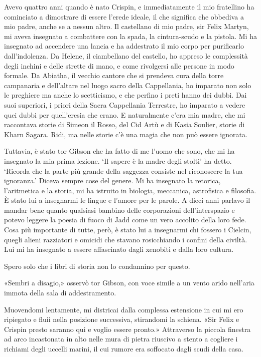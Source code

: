 Avevo quattro anni quando è nato Crispin, e immediatamente il mio
fratellino ha cominciato a dimostrare di essere l'erede ideale, il che
significa che obbediva a mio padre, anche se a nessun altro. Il
castellano di mio padre, sir Felix Martyn, mi aveva insegnato a
combattere con la spada, la cintura-scudo e la pistola. Mi ha insegnato
ad accendere una lancia e ha addestrato il mio corpo per purificarlo
dall'indolenza. Da Helene, il ciambellano del castello, ho appreso le
complessità degli inchini e delle strette di mano, e come rivolgersi
alle persone in modo formale. Da Abiatha, il vecchio cantore che si
prendeva cura della torre campanaria e dell'altare nel luogo sacro della
Cappellania, ho imparato non solo le preghiere ma anche lo scetticismo,
e che perfino i preti hanno dei dubbi. Dai suoi superiori, i priori
della Sacra Cappellania Terrestre, ho imparato a vedere quei dubbi per
quell'eresia che erano. E naturalmente c'era mia madre, che mi
raccontava storie di Simeon il Rosso, del Cid Artù e di Kasia Soulier,
storie di Kharn Sagara. Ridi, ma nelle storie c'è una magia che non può
essere ignorata.

Tuttavia, è stato tor Gibson che ha fatto di me l'uomo che sono, che mi
ha insegnato la mia prima lezione. `Il sapere è la madre degli stolti'
ha detto. `Ricorda che la parte più grande della saggezza consiste nel
riconoscere la tua ignoranza.' Diceva sempre cose del genere. Mi ha
insegnato la retorica, l'aritmetica e la storia, mi ha istruito in
biologia, meccanica, astrofisica e filosofia. È stato lui a insegnarmi
le lingue e l'amore per le parole. A dieci anni parlavo il mandar bene
quanto qualsiasi bambino delle corporazioni dell'interspazio e potevo
leggere la poesia di fuoco di Jadd come un vero accolito della loro
fede. Cosa più importante di tutte, però, è stato lui a insegnarmi chi
fossero i Cielcin, quegli alieni razziatori e omicidi che stavano
rosicchiando i confini della civiltà. Lui mi ha insegnato a essere
affascinato dagli xenobiti e dalla loro cultura.

Spero solo che i libri di storia non lo condannino per questo.

\begin{figure}
	\centering
	\def\svgwidth{\columnwidth}
	\scalebox{0.2}{}
\end{figure}

«Sembri a disagio,» osservò tor Gibson, con voce simile a un vento arido
nell'aria immota della sala di addestramento.

Muovendomi lentamente, mi districai dalla complessa estensione in cui mi
ero ripiegato e fluii nella posizione successiva, stirandomi la schiena.
«Sir Felix e Crispin presto saranno qui e voglio essere pronto.»
Attraverso la piccola finestra ad arco incastonata in alto nelle mura di
pietra riuscivo a stento a cogliere i richiami degli uccelli marini, il
cui rumore era soffocato dagli scudi della casa.


